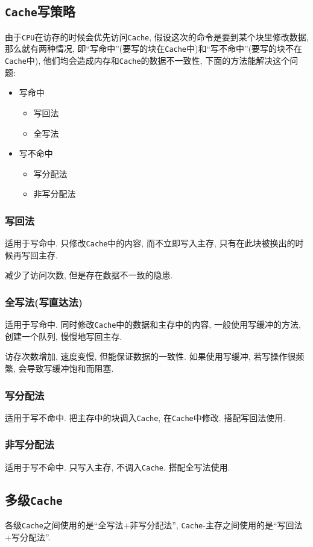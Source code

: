 \subsection{\texttt{Cache}写策略}
由于\verb|CPU|在访存的时候会优先访问\verb|Cache|, 假设这次的命令是要到某个块里修改数据, 那么就有两种情况, 即``写命中''(要写的块在\verb|Cache|中)和``写不命中''(要写的块不在\verb|Cache|中), 他们均会造成内存和\verb|Cache|的数据不一致性, 下面的方法能解决这个问题:
\begin{itemize}
\item 写命中
\begin{itemize}
\item 写回法
\item 全写法
\end{itemize}
\item 写不命中
\begin{itemize}
\item 写分配法
\item 非写分配法
\end{itemize}
\end{itemize}
\subsubsection{写回法}
适用于写命中. 只修改\verb|Cache|中的内容, 而不立即写入主存, 只有在此块被换出的时候再写回主存. \par
减少了访问次数, 但是存在数据不一致的隐患.
\subsubsection{全写法(写直达法)}
适用于写命中. 同时修改\verb|Cache|中的数据和主存中的内容, 一般使用写缓冲的方法, 创建一个队列, 慢慢地写回主存. \par 
访存次数增加, 速度变慢, 但能保证数据的一致性. 如果使用写缓冲, 若写操作很频繁, 会导致写缓冲饱和而阻塞.
\subsubsection{写分配法}
适用于写不命中. 把主存中的块调入\verb|Cache|, 在\verb|Cache|中修改. 搭配写回法使用.
\subsubsection{非写分配法}
适用于写不命中. 只写入主存, 不调入\verb|Cache|. 搭配全写法使用.
\subsection{多级\texttt{Cache}}
各级\verb|Cache|之间使用的是``全写法+非写分配法'', \verb|Cache|-主存之间使用的是``写回法+写分配法''.



















